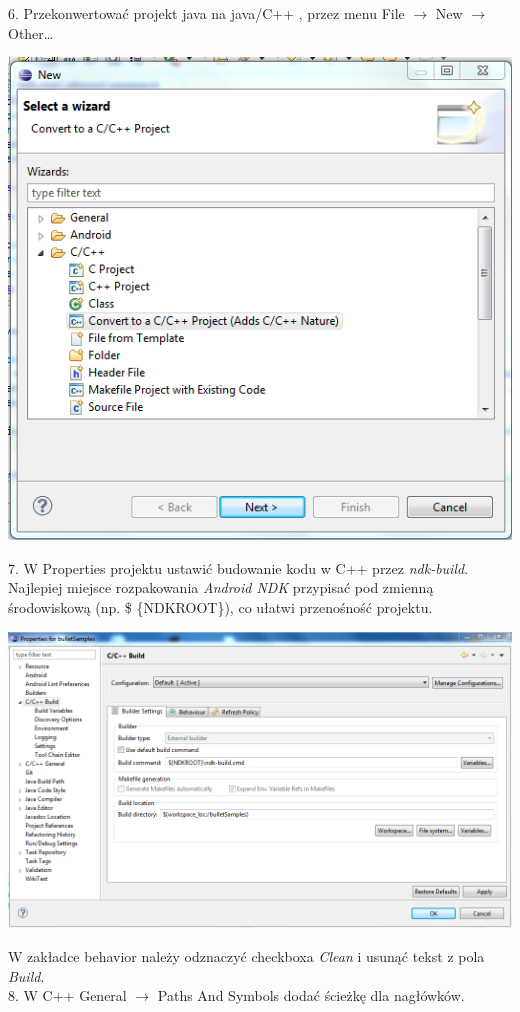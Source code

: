   6. Przekonwertować projekt java na java/C++ , przez menu File $ \rightarrow $
  New $ \rightarrow $ Other\ldots
  
  \includegraphics{./img/convert.png}
  
  7. W Properties projektu ustawić budowanie kodu w C++ przez \emph{ndk-build}.
  Najlepiej miejsce rozpakowania \emph{Android NDK} przypisać pod zmienną
  środowiskową (np. \$ \{NDKROOT\}), co ułatwi przenośność projektu.
  
  \includegraphics[width=\textwidth]{./img/properties.png}
  
  W zakładce behavior należy odznaczyć checkboxa \emph{Clean} i usunąć tekst z
  pola \emph{Build}.\\
  8. W C++ General $ \rightarrow $ Paths And Symbols dodać ścieżkę dla nagłówków.
 
